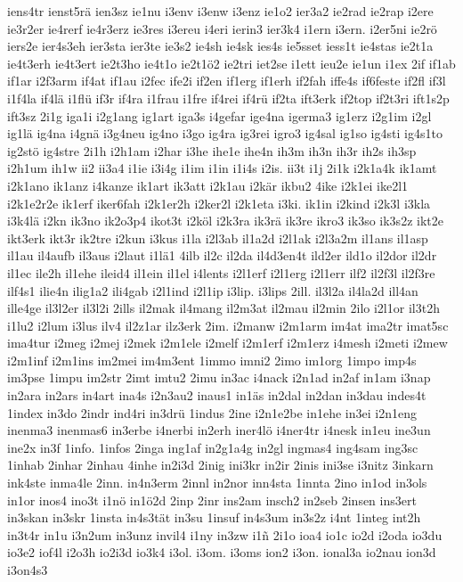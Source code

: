 {iens4tr
ienst5rä
ien3sz
ie1nu
i3env
i3enw
i3enz
ie1o2
ier3a2
ie2rad
ie2rap
i2ere
ie3r2er
ie4rerf
ie4r3erz
ie3res
i3ereu
i4eri
ierin3
ier3k4
i1ern
i3ern.
i2er5ni
ie2rö
iers2e
ier4s3eh
ier3sta
ier3te
ie3s2
ie4sh
ie4sk
ies4s
ie5sset
iess1t
ie4stas
ie2t1a
ie4t3erh
ie4t3ert
ie2t3ho
ie4t1o
ie2t1ö2
ie2tri
iet2se
i1ett
ieu2e
ie1un
i1ex
2if
if1ab
if1ar
i2f3arm
if4at
if1au
i2fec
ife2i
if2en
if1erg
if1erh
if2fah
iffe4s
if6feste
if2fl
if3l
i1f4la
if4lä
i1flü
if3r
if4ra
i1frau
i1fre
if4rei
if4rü
if2ta
ift3erk
if2top
if2t3ri
ift1s2p
ift3sz
2i1g
iga1i
i2g1ang
ig1art
iga3s
i4gefar
ige4na
igerma3
ig1erz
i2g1im
i2gl
ig1lä
ig4na
i4gnä
i3g4neu
ig4no
i3go
ig4ra
ig3rei
igro3
ig4sal
ig1so
ig4sti
ig4s1to
ig2stö
ig4stre
2i1h
i2h1am
i2har
i3he
ihe1e
ihe4n
ih3m
ih3n
ih3r
ih2s
ih3sp
i2h1um
ih1w
ii2
ii3a4
i1ie
i3i4g
i1im
i1in
i1i4s
i2is.
ii3t
i1j
2i1k
i2k1a4k
ik1amt
i2k1ano
ik1anz
i4kanze
ik1art
ik3att
i2k1au
i2kär
ikbu2
4ike
i2k1ei
ike2l1
i2k1e2r2e
ik1erf
iker6fah
i2k1er2h
i2ker2l
i2k1eta
i3ki.
ik1in
i2kind
i2k3l
i3kla
i3k4lä
i2kn
ik3no
ik2o3p4
ikot3t
i2köl
i2k3ra
ik3rä
ik3re
ikro3
ik3so
ik3s2z
ikt2e
ikt3erk
ikt3r
ik2tre
i2kun
i3kus
i1la
i2l3ab
il1a2d
i2l1ak
i2l3a2m
il1ans
il1asp
il1au
il4aufb
il3aus
i2laut
i1lä1
4ilb
il2c
il2da
il4d3en4t
ild2er
ild1o
il2dor
il2dr
il1ec
ile2h
il1ehe
ileid4
il1ein
il1el
i4lents
i2l1erf
i2l1erg
i2l1err
ilf2
il2f3l
il2f3re
ilf4s1
ilie4n
ilig1a2
ili4gab
i2l1ind
i2l1ip
i3lip.
i3lips
2ill.
il3l2a
il4la2d
ill4an
ille4ge
il3l2er
il3l2i
2ills
il2mak
il4mang
il2m3at
il2mau
il2min
2ilo
i2l1or
il3t2h
i1lu2
i2lum
i3lus
ilv4
il2z1ar
ilz3erk
2im.
i2manw
i2m1arm
im4at
ima2tr
imat5sc
ima4tur
i2meg
i2mej
i2mek
i2m1ele
i2melf
i2m1erf
i2m1erz
i4mesh
i2meti
i2mew
i2m1inf
i2m1ins
im2mei
im4m3ent
1immo
imni2
2imo
im1org
1impo
imp4s
im3pse
1impu
im2str
2imt
imtu2
2imu
in3ac
i4nack
i2n1ad
in2af
in1am
i3nap
in2ara
in2ars
in4art
ina4s
i2n3au2
inaus1
in1äs
in2dal
in2dan
in3dau
indes4t
1index
in3do
2indr
ind4ri
in3drü
1indus
2ine
i2n1e2be
in1ehe
in3ei
i2n1eng
inenma3
inenmas6
in3erbe
i4nerbi
in2erh
iner4lö
i4ner4tr
i4nesk
in1eu
ine3un
ine2x
in3f
1info.
1infos
2inga
ing1af
in2g1a4g
in2gl
ingmas4
ing4sam
ing3sc
1inhab
2inhar
2inhau
4inhe
in2i3d
2inig
ini3kr
in2ir
2inis
ini3se
i3nitz
3inkarn
ink4ste
inma4le
2inn.
in4n3erm
2innl
in2nor
inn4sta
1innta
2ino
in1od
in3ols
in1or
inos4
ino3t
i1nö
in1ö2d
2inp
2inr
ins2am
insch2
in2seb
2insen
ins3ert
in3skan
in3skr
1insta
in4s3tät
in3su
1insuf
in4s3um
in3s2z
i4nt
1integ
int2h
in3t4r
in1u
i3n2um
in3unz
invil4
i1ny
in3zw
i1ñ
2i1o
ioa4
io1c
io2d
i2oda
io3du
io3e2
iof4l
i2o3h
io2i3d
io3k4
i3ol.
i3om.
i3oms
ion2
i3on.
ional3a
io2nau
ion3d
i3on4s3
}
